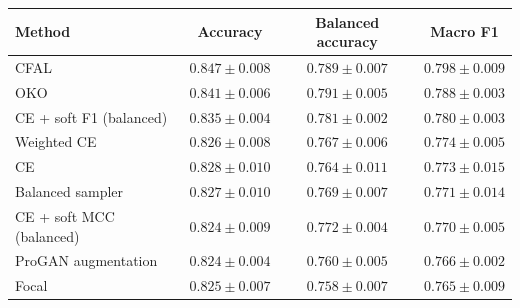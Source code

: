 \begin{tabular}{lccc}
\toprule
Method & Accuracy & Balanced accuracy & Macro F1\\
\midrule
CFAL & $\num{0.847} \pm \num{0.008}$ & $\num{0.789} \pm \num{0.007}$ & $\num{0.798} \pm \num{0.009}$\\
OKO & $\num{0.841} \pm \num{0.006}$ & $\num{0.791} \pm \num{0.005}$ & $\num{0.788} \pm \num{0.003}$\\
CE + soft F1 (balanced) & $\num{0.835} \pm \num{0.004}$ & $\num{0.781} \pm \num{0.002}$ & $\num{0.780} \pm \num{0.003}$\\
Weighted CE & $\num{0.826} \pm \num{0.008}$ & $\num{0.767} \pm \num{0.006}$ & $\num{0.774} \pm \num{0.005}$\\
CE & $\num{0.828} \pm \num{0.010}$ & $\num{0.764} \pm \num{0.011}$ & $\num{0.773} \pm \num{0.015}$\\
Balanced sampler & $\num{0.827} \pm \num{0.010}$ & $\num{0.769} \pm \num{0.007}$ & $\num{0.771} \pm \num{0.014}$\\
CE + soft MCC (balanced) & $\num{0.824} \pm \num{0.009}$ & $\num{0.772} \pm \num{0.004}$ & $\num{0.770} \pm \num{0.005}$\\
ProGAN augmentation & $\num{0.824} \pm \num{0.004}$ & $\num{0.760} \pm \num{0.005}$ & $\num{0.766} \pm \num{0.002}$\\
Focal & $\num{0.825} \pm \num{0.007}$ & $\num{0.758} \pm \num{0.007}$ & $\num{0.765} \pm \num{0.009}$\\
\bottomrule
\end{tabular}
